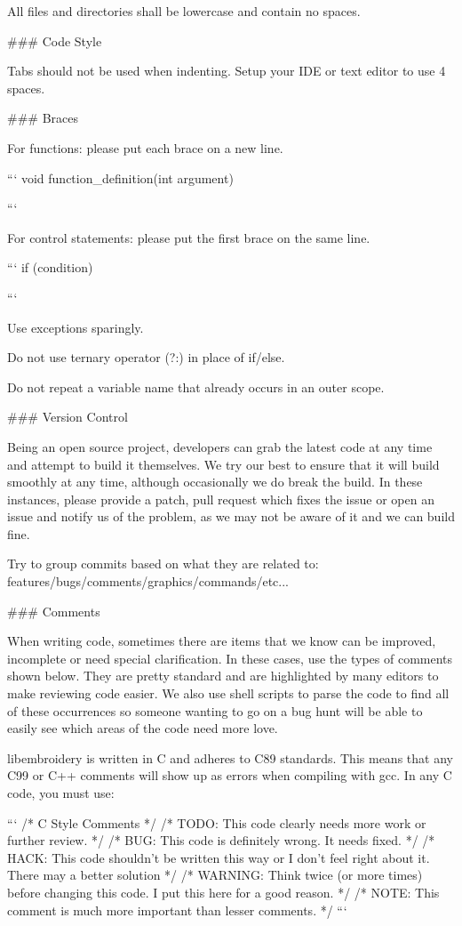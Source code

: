 All files and directories shall be lowercase and contain no spaces.

### Code Style

Tabs should not be used when indenting. Setup your IDE or text editor to use 4 spaces.

### Braces

For functions: please put each brace on a new line.

```
void function\_definition(int argument)
{

}
```

For control statements: please put the first brace on the same line.

```
if (condition) {

}
```

Use exceptions sparingly.

Do not use ternary operator (?:) in place of if/else.

Do not repeat a variable name that already occurs in an outer scope.

### Version Control

Being an open source project, developers can grab the latest code at any
time and attempt to build it themselves. We try our best to ensure that
it will build smoothly at any time, although occasionally we do break
the build. In these instances, please provide a patch, pull request
which fixes the issue or open an issue and notify us of the problem, as
we may not be aware of it and we can build fine.

Try to group commits based on what they are related to:
features/bugs/comments/graphics/commands/etc...

### Comments

When writing code, sometimes there are items that we know can be
improved, incomplete or need special clarification. In these cases, use
the types of comments shown below. They are pretty standard and are
highlighted by many editors to make reviewing code easier. We also use
shell scripts to parse the code to find all of these occurrences so
someone wanting to go on a bug hunt will be able to easily see which
areas of the code need more love.

libembroidery is written in C and adheres to C89 standards. This means
that any C99 or C++ comments will show up as errors when compiling with
gcc. In any C code, you must use:

```
/* C Style Comments */
/* TODO: This code clearly needs more work or further review. */
/* BUG: This code is definitely wrong. It needs fixed. */
/* HACK: This code shouldn't be written this way or I don't feel right about it. There may a better solution */
/* WARNING: Think twice (or more times) before changing this code. I put this here for a good reason. */
/* NOTE: This comment is much more important than lesser comments. */
```

